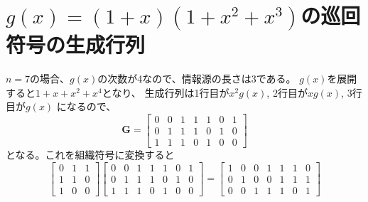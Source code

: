 \documentclass[a4paper,11pt]{jsarticle}
\begin{document}
\section{$g(x)=(1+x)(1+x^2+x^3)$の巡回符号の生成行列}
$n=7$の場合、$g(x)$の次数が4なので、情報源の長さは3である。
$g(x)$を展開すると$1+x+x^2+x^4$となり、
生成行列は1行目が$x^2g(x)$, 2行目が$xg(x)$, 3行目が$g(x)$
になるので、
\[
  {\bm G}=
  \begin{bmatrix}
    0 & 0 & 1 & 1 & 1 & 0 & 1 \\
    0 & 1 & 1 & 1 & 0 & 1 & 0 \\
    1 & 1 & 1 & 0 & 1 & 0 & 0
  \end{bmatrix}
\]
となる。これを組織符号に変換すると
\[
  \begin{bmatrix}
    0 & 1 & 1 \\
    1 & 1 & 0 \\
    1 & 0 & 0
  \end{bmatrix}
  \begin{bmatrix}
    0 & 0 & 1 & 1 & 1 & 0 & 1 \\
    0 & 1 & 1 & 1 & 0 & 1 & 0 \\
    1 & 1 & 1 & 0 & 1 & 0 & 0
  \end{bmatrix}=
  \begin{bmatrix}
    1 & 0 & 0 & 1 & 1 & 1 & 0 \\
    0 & 1 & 0 & 0 & 1 & 1 & 1 \\
    0 & 0 & 1 & 1 & 1 & 0 & 1
  \end{bmatrix}
\]
\end{document}
